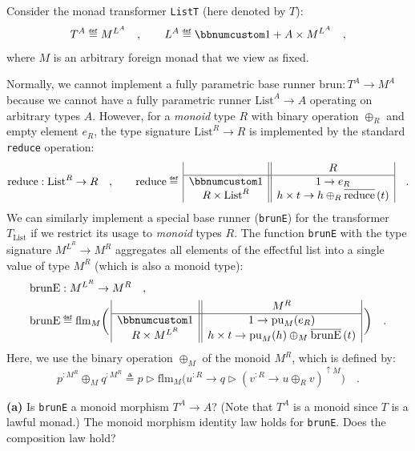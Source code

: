 Consider the monad transformer \lstinline!ListT! (here denoted by
$T$): 
\[
T^{A}\triangleq M^{L^{A}}\quad,\quad\quad L^{A}\triangleq\bbnum 1+A\times M^{L^{A}}\quad,
\]
where $M$ is an arbitrary foreign monad that we view as fixed. 

Normally, we cannot implement a fully parametric base runner $\text{brun}:T^{A}\rightarrow M^{A}$
because we cannot have a fully parametric runner $\text{List}^{A}\rightarrow A$
operating on arbitrary types $A$. However, for a \emph{monoid} type
$R$ with binary operation $\oplus_{R}$ and empty element $e_{R}$,
the type signature $\text{List}^{R}\rightarrow R$ is implemented
by the standard \lstinline!reduce! operation: 
\[
\text{reduce}:\text{List}^{R}\rightarrow R\quad,\quad\quad\text{reduce}\triangleq\,\begin{array}{|c||c|}
 & R\\
\hline \bbnum 1 & 1\rightarrow e_{R}\\
R\times\text{List}^{R} & h\times t\rightarrow h\oplus_{R}\overline{\text{reduce}}\,(t)
\end{array}\quad.
\]
We can similarly implement a special base runner (\lstinline!brunE!)
for the transformer $T_{\text{List}}$ if we restrict its usage to
\emph{monoid} types $R$. The function \lstinline!brunE! with the
type signature $M^{L^{R}}\rightarrow M^{R}$ aggregates all elements
of the effectful list into a single value of type $M^{R}$ (which
is also a monoid type):
\begin{align*}
 & \text{brunE}:M^{L^{R}}\rightarrow M^{R}\quad,\\
 & \text{brunE}\triangleq\text{flm}_{M}\bigg(\,\begin{array}{|c||c|}
 & M^{R}\\
\hline \bbnum 1 & 1\rightarrow\text{pu}_{M}(e_{R})\\
R\times M^{L^{R}} & h\times t\rightarrow\text{pu}_{M}(h)\oplus_{M}\overline{\text{brunE}}\,(t)
\end{array}\,\bigg)\quad.
\end{align*}
Here, we use the binary operation $\oplus_{M}$ of the monoid $M^{R}$,
which is defined by:
\[
p^{:M^{R}}\oplus_{M}q^{:M^{R}}\triangleq p\triangleright\text{flm}_{M}\big(u^{:R}\rightarrow q\triangleright(v^{:R}\rightarrow u\oplus_{R}v)^{\uparrow M}\big)\quad.
\]

\textbf{(a)} Is \lstinline!brunE! a monoid morphism $T^{A}\rightarrow A$?
(Note that $T^{A}$ is a monoid since $T$ is a lawful monad.) The
monoid morphism identity law holds for \lstinline!brunE!. Does the
composition law hold?

